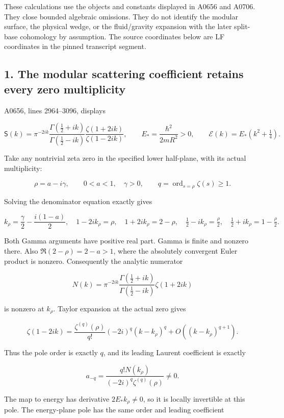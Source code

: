 \documentclass[10pt,a4paper,oneside]{report}
\begin{document}
These calculations use the objects and constants displayed in A0656 and
A0706. They close bounded algebraic omissions. They do not identify the
modular surface, the physical wedge, or the fluid/gravity expansion with
the later split-base cohomology by assumption. The source coordinates
below are LF coordinates in the pinned transcript segment.

\subsection{1. The modular scattering coefficient retains every zero
multiplicity}\label{proof10:the-modular-scattering-coefficient-retains-every-zero-multiplicity}

A0656, lines 2964--3096, displays

\[
\mathsf S(k)=\pi^{-2ik}
\frac{\Gamma(\frac12+ik)}{\Gamma(\frac12-ik)}
\frac{\zeta(1+2ik)}{\zeta(1-2ik)},
\qquad E_* = \frac{\hbar^2}{2mR^2}>0,
\qquad \mathcal E(k)=E_*(k^2+\tfrac14).
\]

Take any nontrivial zeta zero in the specified lower half-plane, with
its actual multiplicity:

\[
\rho=a-i\gamma,\qquad 0<a<1,\quad\gamma>0,
\qquad q=\operatorname{ord}_{s=\rho}\zeta(s)\ge1.
\]

Solving the denominator equation exactly gives

\[
k_\rho=\frac\gamma2-\frac{i(1-a)}2,
\quad 1-2ik_\rho=\rho,
\quad 1+2ik_\rho=2-\rho,
\quad \tfrac12-ik_\rho=\tfrac\rho2,
\quad \tfrac12+ik_\rho=1-\tfrac\rho2.
\]

Both Gamma arguments have positive real part. Gamma is finite and
nonzero there. Also \(\Re(2-\rho)=2-a>1\), where the absolutely
convergent Euler product is nonzero. Consequently the analytic numerator

\[
N(k)=\pi^{-2ik}
\frac{\Gamma(\frac12+ik)}{\Gamma(\frac12-ik)}\zeta(1+2ik)
\]

is nonzero at \(k_\rho\). Taylor expansion at the actual zero gives

\[
\zeta(1-2ik)
=\frac{\zeta^{(q)}(\rho)}{q!}(-2i)^q(k-k_\rho)^q
+O((k-k_\rho)^{q+1}).
\]

Thus the pole order is exactly \(q\), and its leading Laurent
coefficient is exactly

\[
a_{-q}=
\frac{q!N(k_\rho)}{(-2i)^q\zeta^{(q)}(\rho)}\ne0.
\]

The map to energy has derivative \(2E_*k_\rho\ne0\), so it is locally
invertible at this pole. The energy-plane pole has the same order and
leading coefficient
\end{document}
